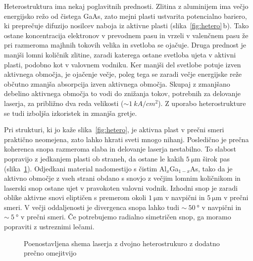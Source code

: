 Heterostruktura ima nekaj poglavitnih prednosti. Zlitina z aluminijem ima večjo 
energijsko režo od čistega GaAs, zato mejni plasti ustvarita potencialno bariero, 
ki preprečuje difuzijo nosilcev naboja iz aktivne plasti (slika~\ref{fig:hetero}\,b). Tako ostane koncentracija 
elektronov v prevodnem pasu in vrzeli v valenčnem pasu že pri razmeroma majhnih tokovih
velika in svetloba se ojačuje. Druga prednost je manjši lomni količnik zlitine, 
zaradi katerega ostane svetloba ujeta v aktivni plasti, podobno kot v valovnem 
vodniku. Ker manjši del svetlobe potuje izven aktivnega območja, je ojačenje večje,
poleg tega se zaradi večje energijske reže občutno zmanjša absorpcija izven aktivnega območja.
Skupaj z zmanjšano debelino aktivnega območja to vodi do znižanja tokov, 
potrebnih za delovanje laserja, za približno dva reda velikosti ($\sim 1~\si{kA}/\si{cm}^2$). 
Z uporabo heterostrukture se tudi izboljša izkoristek in zmanjša gretje.  

Pri strukturi, ki jo kaže slika~\ref{fig:hetero}, je aktivna plast v prečni smeri praktično neomejena, 
zato lahko hkrati sveti mnogo nihanj. Posledično je prečna koherenca snopa razmeroma slaba in 
delovanje laserja nestabilno. To slabost popravijo z jedkanjem plasti ob straneh, da ostane le
kakih $5~\si{\micro\meter}$ širok pas (slika~\ref{fig:heshema}). 
Odjedkani material nadomestijo s čistim Al$_x$Ga$_{1-x}$As, 
tako da je aktivno območje z vseh strani obdano s snovjo z večjim lomnim količnikom in laserski
snop ostane ujet v pravokoten valovni vodnik. Izhodni snop je zaradi oblike aktivne snovi eliptičen s 
premerom okoli $1~\si{\micro\meter}$ v navpični in $5~\si{\micro\meter}$ v prečni smeri. 
V večji oddaljenosti je divergenca snopa lahko tudi $\sim~50~\si{\degree}$ v navpični in $\sim~5~\si{\degree}$ 
v prečni smeri. Če potrebujemo radialno simetričen snop, ga moramo popraviti z ustreznimi 
lečami.
\begin{figure}[ht]
\centering
\def\svgwidth{95truemm} 

\caption{Poenostavljena shema laserja z dvojno heterostrukuro z dodatno prečno omejitvijo
}
\label{fig:heshema}
\end{figure}

